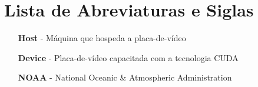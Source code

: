 \chapter*{Lista de Abreviaturas e Siglas}
\begin{itemize}
\item[\textbf{Host}] - Máquina que hospeda a placa-de-vídeo
\item[\textbf{Device}] - Placa-de-vídeo capacitada com a tecnologia CUDA
\item[\textbf{NOAA}] - National Oceanic \& Atmospheric Administration
\end{itemize}
